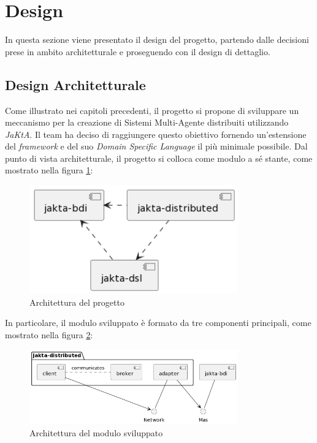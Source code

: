 \section{Design}
In questa sezione viene presentato il design del progetto, partendo dalle decisioni prese in ambito architetturale e proseguendo con il design di dettaglio.

\subsection{Design Architetturale}
Come illustrato nei capitoli precedenti, il progetto si propone di sviluppare un meccanismo per la creazione di Sistemi Multi-Agente distribuiti utilizzando \textit{JaKtA}.
Il team ha deciso di raggiungere questo obiettivo fornendo un'estensione del \textit{framework} e del suo \textit{Domain Specific Language} il più minimale possibile.
Dal punto di vista architetturale, il progetto si colloca come modulo a sé stante, come mostrato nella figura \ref{fig:architecture}:

\begin{figure}[ht!]
    \centering
    \includegraphics[width=0.8\textwidth]{figures/general-architecture.png}
    \caption{Architettura del progetto}
    \label{fig:architecture}
\end{figure}

In particolare, il modulo sviluppato è formato da tre componenti principali, come mostrato nella figura \ref{fig:detailed-architecture}:

\begin{figure}[ht!]
    \centering
    \includegraphics[width=0.8\textwidth]{figures/detailed-architecture.png}
    \caption{Architettura del modulo sviluppato}
    \label{fig:detailed-architecture}
\end{figure}

